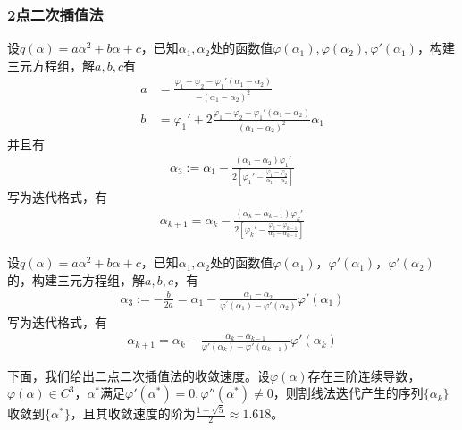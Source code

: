         \subsubsection{2点二次插值法}
            \par
            设$q(\alpha)=a{\alpha}^2+b{\alpha}+c$，已知${\alpha}_1,{\alpha}_2$处的函数值$\varphi({\alpha}_1),\varphi({\alpha}_2),{\varphi}'({\alpha}_1)$，构建三元方程组，解$a,b,c$有
            \begin{align*}
            a&=\frac {{\varphi}_1-{\varphi}_2-{\varphi}_1'({\alpha}_1-{\alpha}_2)}{-{({\alpha}_1-{\alpha}_2)}^2}\\
            b&={\varphi}_1'+2 \frac{{\varphi}_1-{\varphi}_2-{\varphi}_1'({\alpha}_1-{\alpha}_2)}{{({\alpha}_1-{\alpha}_2)}^2} {\alpha}_1
            \end{align*}
            并且有
            \begin{align*}
            {\alpha}_3:={\alpha}_1-\frac{({\alpha}_1-{\alpha}_2){\varphi}_1'}{2[{\varphi}_1'-\frac {{\varphi}_1-{\varphi}_2}{{\alpha}_1-{\alpha}_2}]}
            \end{align*}
            写为迭代格式，有
            \begin{align*}
            {\alpha}_{k+1}={\alpha}_k-\frac{({\alpha}_k-{\alpha}_{k-1}){\varphi}_k'}{2[{\varphi}_k'-\frac {{\varphi}_k-{\varphi}_{k-1}}{{\alpha}_k-{\alpha}_{k-1}}]}
            \end{align*}
            \par
            设$q(\alpha)=a{\alpha}^2+b{\alpha}+c$，已知${\alpha}_1,{\alpha}_2$处的函数值$\varphi({\alpha}_1)$，${\varphi}'({\alpha}_1)$，${\varphi}'({\alpha}_2)$的，构建三元方程组，解$a,b,c$，有
            \begin{align*}
            {\alpha}_3:=-\frac {b}{2a}={\alpha}_1-\frac{{\alpha}_1-{\alpha}_2}{{\varphi}^{'}({\alpha}_1)-{\varphi}'({\alpha}_2)}{\varphi}'({\alpha}_1)
            \end{align*}
            写为迭代格式，有
            \begin{align*}
            {\alpha}_{k+1}={\alpha}_k-\frac{{\alpha}_k-{\alpha}_{k-1}}{{\varphi}'({\alpha}_k)-{\varphi}'({\alpha}_{k-1})}{\varphi}'({\alpha}_k)
            \end{align*}
            \par
            下面，我们给出二点二次插值法的收敛速度。设$\varphi(\alpha)$存在三阶连续导数，$\varphi(\alpha) \in C^3$，${\alpha}^*$满足${\varphi}'({\alpha}^*)=0,{\varphi}''({\alpha}^*) \ne 0$，则割线法迭代产生的序列$\{{\alpha}_k\}$收敛到$\{{\alpha}^*\}$，且其收敛速度的阶为$\frac{1+\sqrt{5}}{2} \approx 1.618$。\\
